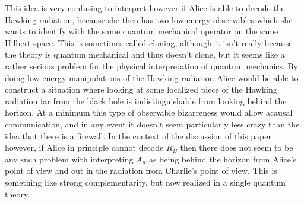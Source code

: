 \documentclass[12pt]{article}
\begin{document}
This idea is very confusing to interpret however if Alice is able to decode the Hawking radiation, because she then has two low energy observables which she wants to identify with the same quantum mechanical operator on the same Hilbert space.  This is sometimes called cloning, although it isn't really because the theory is quantum mechanical and thus doesn't clone, but it seems like a rather serious problem for the physical interpretation of quantum mechanics.  By doing low-energy manipulations of the Hawking radiation Alice would be able to construct a situation where looking at some localized piece of the Hawking radiation far from the black hole is indistinguishable from looking behind the horizon.  At a minimum this type of observable bizarreness would allow acausal communication, and in any event it doesn't seem particularly less crazy than the idea that there is a firewall.  In the context of the discussion of this paper however, if Alice in principle cannot decode $R_B$ then there does not seem to be any such problem with interpreting $A_n$ as being behind the horizon from Alice's point of view and out in the radiation from Charlie's point of view.  This is something like strong complementarity, but now realized in a single quantum theory.
\end{document}
